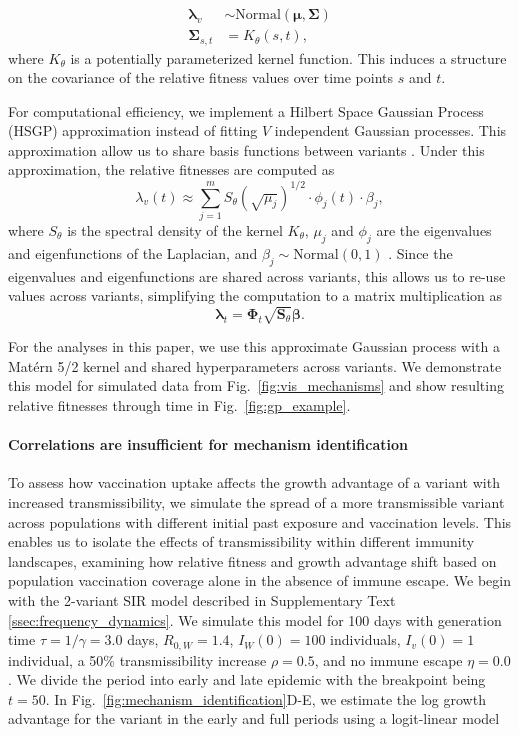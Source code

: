 \documentclass[11pt,oneside,letterpaper]{article}
\renewcommand{\vec}[1]{\boldsymbol{#1}}
\newcommand{\wt}{W}
\newcommand{\varEscape}{\eta}
\newcommand{\varTransmission}{\rho}
\begin{document}
\begin{align}
    \vec{\lambda}_{v} &\sim \text{Normal}(\vec{\mu}, \vec{\Sigma})\\
    \vec{\Sigma}_{s, t} &= K_{\theta}(s, t),
\end{align}
where $K_{\theta}$ is a potentially parameterized kernel function.
This induces a structure on the covariance of the relative fitness values over time points $s$ and $t$.

For computational efficiency, we implement a Hilbert Space Gaussian Process (HSGP) approximation instead of fitting $V$ independent Gaussian processes.
This approximation allow us to share basis functions between variants \cite{riutortmayol2022practical}.
Under this approximation, the relative fitnesses are computed as
\begin{equation}
    \lambda_{v}(t) \approx \sum_{j=1}^{m} S_{\theta}(\sqrt{\mu_{j}})^{1/2} \cdot \phi_{j}(t) \cdot \beta_{j},
\end{equation}
where $S_{\theta}$ is the spectral density of the kernel $K_\theta$, $\mu_{j}$ and $\phi_{j}$ are the eigenvalues and eigenfunctions of the Laplacian, and $\beta_{j} \sim \text{Normal}(0,1)$ \cite{riutortmayol2022practical}.
Since the eigenvalues and eigenfunctions are shared across variants, this allows us to re-use values across variants, simplifying the computation to a matrix multiplication as
\begin{equation}
    \vec{\lambda}_{t} = \vec{\Phi}_{t} \sqrt{\vec{S}_{\theta}}\vec{\beta}.
\end{equation}

For the analyses in this paper, we use this approximate Gaussian process with a Mat\'ern 5/2 kernel and shared hyperparameters across variants.
We demonstrate this model for simulated data from Fig.~\ref{fig:vis_mechanisms} and show resulting relative fitnesses through time in Fig.~\ref{fig:gp_example}.

\paragraph{Correlations are insufficient for mechanism identification}

To assess how vaccination uptake affects the growth advantage of a variant with increased transmissibility, we simulate the spread of a more transmissible variant across populations with different initial past exposure and vaccination levels.
This enables us to isolate the effects of transmissibility within different immunity landscapes, examining how relative fitness and growth advantage shift based on population vaccination coverage alone in the absence of immune escape.
We begin with the 2-variant SIR model described in Supplementary Text \ref{ssec:frequency_dynamics}.
We simulate this model for 100 days with generation time $\tau = 1 / \gamma = 3.0$ days, $R_{0, \wt} = 1.4$, $I_{\wt}(0) = 100$ individuals, $I_v(0) = 1$ individual, a 50\% transmissibility increase $\varTransmission=0.5$, and no immune escape $\varEscape=0.0$.
We divide the period into early and late epidemic with the breakpoint being $t=50$.
In Fig.~\ref{fig:mechanism_identification}D-E, we estimate the log growth advantage for the variant in the early and full periods using a logit-linear model
\end{document}
